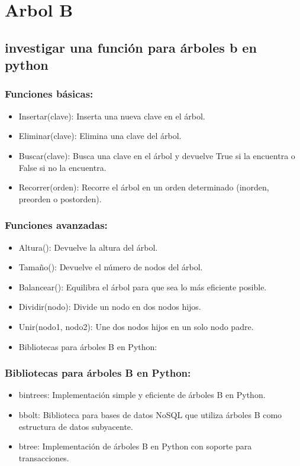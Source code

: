 \section{Arbol B}

\subsection{investigar una función para árboles b en python}

\subsubsection{Funciones básicas:}

\begin{itemize}
  \item Insertar(clave): Inserta una nueva clave en el árbol.
  \item Eliminar(clave): Elimina una clave del árbol.
  \item Buscar(clave): Busca una clave en el árbol y devuelve True si la encuentra o False si no la encuentra.
  \item Recorrer(orden): Recorre el árbol en un orden determinado (inorden, preorden o postorden).
\end{itemize}

\subsubsection{Funciones avanzadas:}

\begin{itemize}
  \item Altura(): Devuelve la altura del árbol.
  \item Tamaño(): Devuelve el número de nodos del árbol.
  \item Balancear(): Equilibra el árbol para que sea lo más eficiente posible.
  \item Dividir(nodo): Divide un nodo en dos nodos hijos.
  \item Unir(nodo1, nodo2): Une dos nodos hijos en un solo nodo padre.
  \item Bibliotecas para árboles B en Python:
\end{itemize}

\subsubsection{Bibliotecas para árboles B en Python:}

\begin{itemize}
  \item bintrees: Implementación simple y eficiente de árboles B en Python.
  \item bbolt: Biblioteca para bases de datos NoSQL que utiliza árboles B como estructura de datos subyacente.
  \item btree: Implementación de árboles B en Python con soporte para transacciones.
\end{itemize}


